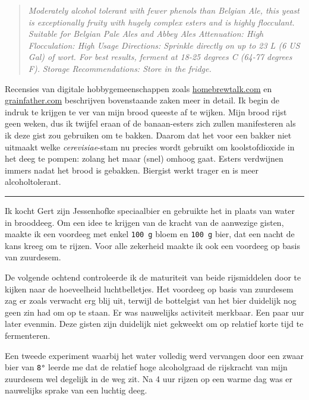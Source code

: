 \documentclass[
  11pt,
  dutch,
]{memoir}
\begin{document}
\begin{quote}
\emph{Moderately alcohol tolerant with fewer phenols than Belgian Ale,
this yeast is exceptionally fruity with hugely complex esters and is
highly flocculant.} \newline \emph{Suitable for Belgian Pale Ales and
Abbey Ales} \newline \emph{Attenuation: High} \newline
\emph{Flocculation: High} \newline \emph{Usage Directions: Sprinkle
directly on up to 23 L (6 US Gal) of wort. For best results, ferment at
18-25 degrees C (64-77 degrees F).} \newline \emph{Storage
Recommendations: Store in the fridge.}
\end{quote}

Recensies van digitale hobbygemeenschappen zoals
\href{http://homebrewtalk.com}{homebrewtalk.com} en
\href{http://www.grainfather.com}{grainfather.com} beschrijven
bovenstaande zaken meer in detail. Ik begin de indruk te krijgen te ver
van mijn brood queeste af te wijken. Mijn brood rijst geen weken, dus ik
twijfel eraan of de banaan-esters zich zullen manifesteren als ik deze
gist zou gebruiken om te bakken. Daarom dat het voor een bakker niet
uitmaakt welke \emph{cerevisiae}-stam nu precies wordt gebruikt om
koolstofdioxide in het deeg te pompen: zolang het maar (snel) omhoog
gaat. Esters verdwijnen immers nadat het brood is gebakken. Biergist
werkt trager en is meer alcoholtolerant.

\pfbreak

Ik kocht Gert zijn Jessenhofke speciaalbier en gebruikte het in plaats
van water in brooddeeg. Om een idee te krijgen van de kracht van de
aanwezige gisten, maakte ik een voordeeg met enkel \texttt{100\ g} bloem
en \texttt{100\ g} bier, dat een nacht de kans kreeg om te rijzen. Voor
alle zekerheid maakte ik ook een voordeeg op basis van zuurdesem.

De volgende ochtend controleerde ik de maturiteit van beide rijsmiddelen
door te kijken naar de hoeveelheid luchtbelletjes. Het voordeeg op basis
van zuurdesem zag er zoals verwacht erg blij uit, terwijl de bottelgist
van het bier duidelijk nog geen zin had om op te staan. Er was
nauwelijks activiteit merkbaar. Een paar uur later evenmin. Deze gisten
zijn duidelijk niet gekweekt om op relatief korte tijd te fermenteren.

Een tweede experiment waarbij het water volledig werd vervangen door een
zwaar bier van \texttt{8°} leerde me dat de relatief hoge alcoholgraad
de rijskracht van mijn zuurdesem wel degelijk in de weg zit. Na 4 uur
rijzen op een warme dag was er nauwelijks sprake van een luchtig deeg.
\end{document}

